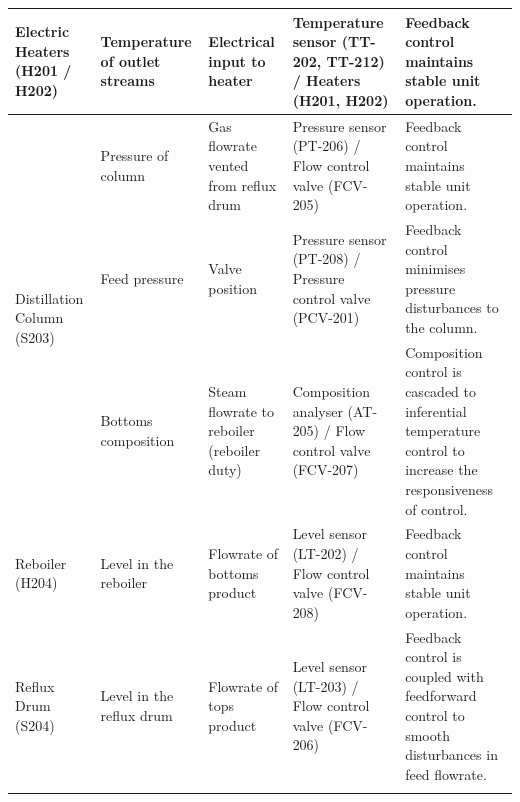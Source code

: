 \begin{table}[h]
{\begin{tabular}{@{}p{3cm}|p{3cm}|p{4cm}|p{5cm}|p{6cm}@{}}
                                                                                        \midrule
Electric Heaters (H201 / H202)              & Temperature of outlet streams               & Electrical input to heater                              & Temperature sensor (TT-202, TT-212) / Heaters (H201, H202)                 & Feedback control maintains stable unit operation.                                                                                    \\ \midrule
\multirow{3}{*}{Distillation Column (S203)}
                                            & Pressure of column        & Gas   flowrate vented from reflux drum & Pressure   sensor (PT-206) / Flow control valve (FCV-205) & Feedback   control maintains stable unit operation.                                                                \\
                                            & Feed   pressure                             & Valve position                                          & Pressure sensor (PT-208) / Pressure control valve (PCV-201)                & Feedback control minimises pressure disturbances to the column.\\
                                           & Bottoms composition                         & Steam flowrate to reboiler (reboiler duty)              & Composition analyser (AT-205) / Flow control valve (FCV-207)               & Composition control is cascaded to inferential temperature control to   increase the responsiveness of control.                      \\\midrule
Reboiler (H204)                             & Level in the reboiler                       & Flowrate of bottoms product                             & Level sensor (LT-202) / Flow control valve (FCV-208)                       & Feedback control maintains stable unit operation.                                                                                    \\ \midrule
Reflux Drum (S204)        & Level in   the reflux drum & Flowrate   of tops product            & Level   sensor (LT-203) / Flow control valve (FCV-206)   & Feedback   control is coupled with feedforward control to smooth disturbances in feed flowrate.                   \\
                                            &                                             &                                                         &                                                                            &                                                                                                                                      \\ \midrule

\end{tabular}}
\end{table}
